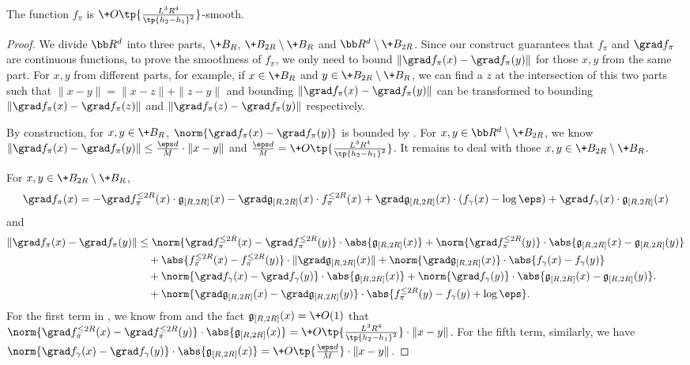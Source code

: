 \begin{lemma}\label{lem:f2smooth}
    The function $f_\pi$ is $\+O\tp{\frac{L^3R^4}{\tp{h_2-h_1}^2}}$-smooth.
\end{lemma}
\begin{proof}
    We divide $\bb R^d$ into three parts, $\+B_R$, $\+B_{2R}\setminus \+B_{R}$ and $\bb R^d \setminus \+B_{2R}$. Since our construct guarantees that $f_\pi$ and $\grad f_{\pi}$ are continuous functions, to prove the smoothness of $f_{\pi}$, we only need to bound $\|\grad f_{\pi}(x) - \grad f_{\pi}(y)\|$ for those $x,y$ from the same part. For $x,y$ from different parts, for example, if $x\in \+B_R$ and $y\in \+B_{2R}\setminus \+B_{R}$, we can find a $z$ at the intersection of this two parts such that $\|x-y\|=\|x-z\|+\|z-y\|$ and bounding $\|\grad f_{\pi}(x) - \grad f_{\pi}(y)\|$ can be transformed to bounding $\|\grad f_{\pi}(x) - \grad f_{\pi}(z)\|$ and $\|\grad f_{\pi}(z) - \grad f_{\pi}(y)\|$ respectively.

    By construction, for $x,y\in \+B_R$, $\norm{\grad f_\pi(x)-\grad f_\pi(y)}$ is bounded by . For $x,y\in \bb R^d \setminus \+B_{2R}$, we know $\|\grad f_\pi(x)-\grad f_\pi(y)\|\leq \frac{\eps d}{M}\cdot \|x-y\|$ and $\frac{\eps d}{M} = \+O\tp{\frac{L^3R^4}{\tp{h_2-h_1}^2}}$. It remains to deal with those $x,y\in \+B_{2R}\setminus \+B_{R}$.

    For $x,y\in \+B_{2R}\setminus \+B_{R}$,
    \[
        \grad f_\pi(x) = - \grad f^{\le 2R}_\pi(x) \cdot \mathfrak{g}_{[R,2R]}(x) - \grad \mathfrak{g}_{[R,2R]}(x) \cdot f^{\le 2R}_\pi(x) + \grad \mathfrak{g}_{[R,2R]}(x) \cdot (f_{\gamma}(x)-\log \eps) + \grad f_{\gamma}(x) \cdot  \mathfrak{g}_{[R,2R]}(x)
    \] 
    and
    \begin{align}
        \|\grad f_\pi(x) - \grad f_\pi(y)\| &\leq  \norm{\grad f^{\le 2R}_\pi(x) - \grad f^{\le 2R}_\pi(y)}\cdot \abs{\mathfrak{g}_{[R,2R]}(x)} + \norm{\grad f^{\le 2R}_\pi(y)}\cdot \abs{\mathfrak{g}_{[R,2R]}(x) - \mathfrak{g}_{[R,2R]}(y)} \notag \\
        &\quad + \abs{f^{\le 2R}_\pi(x) - f^{\le 2R}_\pi(y)}\cdot \|\grad \mathfrak{g}_{[R,2R]}(x)\|  + \norm{\grad \mathfrak{g}_{[R,2R]}(x)}\cdot \abs{f_{\gamma}(x) - f_{\gamma}(y)} \notag  \\
        &\quad + \norm{\grad f_{\gamma}(x) - \grad f_{\gamma}(y)}\cdot \abs{\mathfrak{g}_{[R,2R]}(x)} + \norm{\grad f_{\gamma}(y)}\cdot \abs{\mathfrak{g}_{[R,2R]}(x) - \mathfrak{g}_{[R,2R]}(y)}.\notag  \\
        &\quad + \norm{\grad \mathfrak{g}_{[R,2R]}(x) - \grad \mathfrak{g}_{[R,2R]}(y)} \cdot \abs{f^{\le 2R}_\pi(y) -f_{\gamma}(y)+\log \eps} . \label{eq:grad2}
    \end{align}
    For the first term in , we know from  and the fact $\mathfrak{g}_{[R,2R]}(x)=\+O(1)$ that $\norm{\grad f^{\le 2R}_\pi(x) - \grad f^{\le 2R}_\pi(y)}\cdot \abs{\mathfrak{g}_{[R,2R]}(x)} = \+O\tp{\frac{L^3R^4}{\tp{h_2-h_1}^2}}\cdot \|x-y\|$. For the fifth term, similarly, we have $\norm{\grad f_{\gamma}(x) - \grad f_{\gamma}(y)}\cdot \abs{\mathfrak{g}_{[R,2R]}(x)} = \+O\tp{\frac{\eps d}{M}}\cdot \|x-y\|$.


\end{proof}
